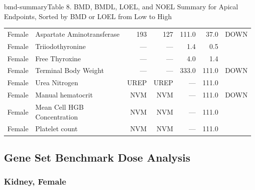 \begin{niehstable}{bmd-summary}{Table 8. BMD, BMDL, LOEL, and NOEL Summary for Apical Endpoints, Sorted by BMD or LOEL from Low to High}
\begin{tabular}{l l r r r r l}
Female & Aspartate Aminotransferase & 193 & 127 & 111.0 & 37.0 & DOWN \\
Female & Triiodothyronine & — & — & 1.4 & 0.5 &  \\
Female & Free Thyroxine & — & — & 4.0 & 1.4 &  \\
Female & Terminal Body Weight & — & — & 333.0 & 111.0 & DOWN \\
Female & Urea Nitrogen & UREP & UREP & — & 111.0 &  \\
Female & Manual hematocrit & NVM & NVM & — & 111.0 & DOWN \\
Female & Mean Cell HGB Concentration & NVM & NVM & — & 111.0 &  \\
Female & Platelet count & NVM & NVM & — & 111.0 &  \\
\bottomrule
\end{tabular}
\end{niehstable}

\subsection{Gene Set Benchmark Dose Analysis}

\subsubsection{Kidney, Female}

